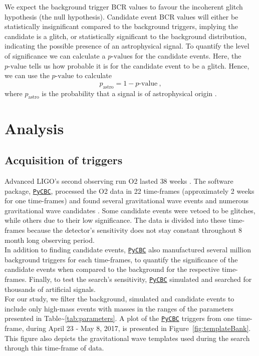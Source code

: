 \documentclass[%
preprint,
 amsmath,amssymb,
 aps,
]{revtex4}
\newcommand{\pycbc}{{\sc \href{https://pycbc.org/}{\texttt{PyCBC}}}\xspace}
\newcommand{\bcr}{{\sc BCR}\xspace}
\newcommand{\pastro}{{\sc $p_\text{astro}$}\xspace}
\begin{document}
We expect the background trigger \bcr values to favour the incoherent glitch hypothesis (the null hypothesis). Candidate event \bcr values will either be statistically insignificant compared to the background triggers, implying the candidate is a glitch, or statistically significant to the background distribution, indicating the possible presence of an astrophysical signal. To quantify the level of significance we can calculate a $p\text{-value}$s for the candidate events. Here, the $p\text{-value}$ tells us how probable it is for the candidate event to be a glitch. Hence, we can use the $p\text{-value}$ to calculate
\begin{equation}
    p_\text{astro} = 1 - p\text{-value} \ ,
\end{equation}
where \pastro is the probability that a signal is of astrophysical origin \cite{pastro_1,pastro_2,pastro_3}.


\section{Analysis}\label{sec:Analysis}

\subsection{Acquisition of triggers}
Advanced LIGO's second observing run O2 lasted $38$ weeks \cite{GWOSC}. The software package, \pycbc \cite{pycbc_code}, processed the O2 data in 22 time-frames (approximately 2 weeks for one time-frames) and found several gravitational wave events and numerous gravitational wave candidates \cite{pycbc_og0, pycbc_og1, pycbc_og2, pycbc_og3, pycbc_og4, pycbc_og5}. Some candidate events were vetoed to be glitches, while others due to their low significance. The data is divided into these time-frames because the detector's sensitivity does not stay constant throughout 8 month long observing period.\\

In addition to finding candidate events, \pycbc also manufactured several million background triggers for each time-frames, to quantify the significance of the candidate events when compared to the background for the respective time-frames. Finally, to test the search's sensitivity, \pycbc simulated and searched for thousands of artificial signals. \\

For our study, we filter the background, simulated and candidate events to  include only high-mass events with masses in the ranges of the parameters presented in Table\textasciitilde\ref{tab:parameters}. A plot of the \pycbc triggers from one time-frame, during April 23 - May 8, 2017, is presented in Figure~\ref{fig:templateBank}. This figure also depicts the gravitational wave templates used during the search through this time-frame of data. \\
\end{document}
